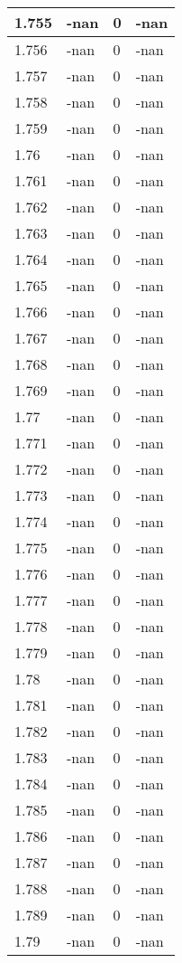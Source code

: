 \documentclass[a4paper,14pt]{extarticle}
\begin{document}
\begin{longtable}{||m{3cm}||m{3cm}|m{3cm}||m{3cm}||}
\hline
1.755 & -nan & 0 & -nan\\
\hline
1.756 & -nan & 0 & -nan\\
\hline
1.757 & -nan & 0 & -nan\\
\hline
1.758 & -nan & 0 & -nan\\
\hline
1.759 & -nan & 0 & -nan\\
\hline
1.76 & -nan & 0 & -nan\\
\hline
1.761 & -nan & 0 & -nan\\
\hline
1.762 & -nan & 0 & -nan\\
\hline
1.763 & -nan & 0 & -nan\\
\hline
1.764 & -nan & 0 & -nan\\
\hline
1.765 & -nan & 0 & -nan\\
\hline
1.766 & -nan & 0 & -nan\\
\hline
1.767 & -nan & 0 & -nan\\
\hline
1.768 & -nan & 0 & -nan\\
\hline
1.769 & -nan & 0 & -nan\\
\hline
1.77 & -nan & 0 & -nan\\
\hline
1.771 & -nan & 0 & -nan\\
\hline
1.772 & -nan & 0 & -nan\\
\hline
1.773 & -nan & 0 & -nan\\
\hline
1.774 & -nan & 0 & -nan\\
\hline
1.775 & -nan & 0 & -nan\\
\hline
1.776 & -nan & 0 & -nan\\
\hline
1.777 & -nan & 0 & -nan\\
\hline
1.778 & -nan & 0 & -nan\\
\hline
1.779 & -nan & 0 & -nan\\
\hline
1.78 & -nan & 0 & -nan\\
\hline
1.781 & -nan & 0 & -nan\\
\hline
1.782 & -nan & 0 & -nan\\
\hline
1.783 & -nan & 0 & -nan\\
\hline
1.784 & -nan & 0 & -nan\\
\hline
1.785 & -nan & 0 & -nan\\
\hline
1.786 & -nan & 0 & -nan\\
\hline
1.787 & -nan & 0 & -nan\\
\hline
1.788 & -nan & 0 & -nan\\
\hline
1.789 & -nan & 0 & -nan\\
\hline
1.79 & -nan & 0 & -nan\\

\end{longtable}
\end{document}

